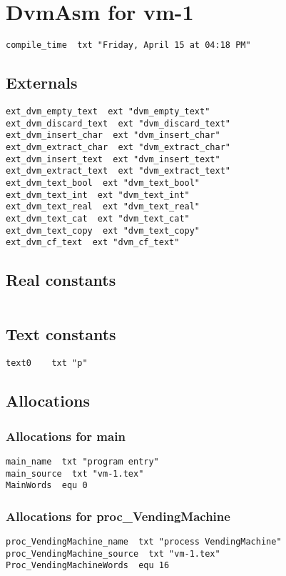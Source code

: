 
\section{DvmAsm for vm-1}
\begin{verbatim}
compile_time  txt "Friday, April 15 at 04:18 PM"
\end{verbatim}

\subsection{Externals}
\begin{verbatim}
ext_dvm_empty_text  ext "dvm_empty_text"
ext_dvm_discard_text  ext "dvm_discard_text"
ext_dvm_insert_char  ext "dvm_insert_char"
ext_dvm_extract_char  ext "dvm_extract_char"
ext_dvm_insert_text  ext "dvm_insert_text"
ext_dvm_extract_text  ext "dvm_extract_text"
ext_dvm_text_bool  ext "dvm_text_bool"
ext_dvm_text_int  ext "dvm_text_int"
ext_dvm_text_real  ext "dvm_text_real"
ext_dvm_text_cat  ext "dvm_text_cat"
ext_dvm_text_copy  ext "dvm_text_copy"
ext_dvm_cf_text  ext "dvm_cf_text"
\end{verbatim}

\subsection{Real constants}
\begin{verbatim}
\end{verbatim}

\subsection{Text constants}
\begin{verbatim}
text0    txt "p"
\end{verbatim}

\subsection{Allocations}

\subsubsection{Allocations for main}
\begin{verbatim}
main_name  txt "program entry"
main_source  txt "vm-1.tex"
MainWords  equ 0
\end{verbatim}

\subsubsection{Allocations for proc\_VendingMachine}
\begin{verbatim}
proc_VendingMachine_name  txt "process VendingMachine"
proc_VendingMachine_source  txt "vm-1.tex"
Proc_VendingMachineWords  equ 16
\end{verbatim}

